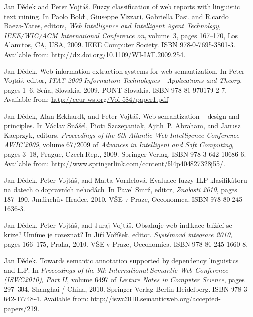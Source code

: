 \begin{description}
\item
Jan D{\v{e}}dek and Peter Vojt{\'{a}}{\v{s}}.
\newblock Fuzzy classification of web reports with linguistic text mining.
\newblock In Paolo Boldi, Giuseppe Vizzari, Gabriella Pasi, and Ricardo
  Baeza-Yates, editors, {\em Web Intelligence and Intelligent Agent Technology,
  IEEE/WIC/ACM International Conference on}, volume~3, pages 167--170, Los
  Alamitos, CA, USA, 2009. IEEE Computer Society.
\newblock ISBN 978-0-7695-3801-3.
\newblock Available from: \url{http://dx.doi.org/10.1109/WI-IAT.2009.254}.

\item
Jan D{\v{e}}dek.
\newblock Web information extraction systems for web semantization.
\newblock In Peter Vojt{\'{a}}{\v{s}}, editor, {\em {ITAT} 2009 Information
  Technologies - Applications and Theory}, pages 1--6, Se{\v{n}}a, Slovakia,
  2009. {PONT} Slovakia.
\newblock ISBN 978-80-970179-2-7.
\newblock Available from: \url{http://ceur-ws.org/Vol-584/paper1.pdf}.

\item
Jan D{\v{e}}dek, Alan Eckhardt, and Peter Vojt{\'{a}}{\v{s}}.
\newblock Web semantization -- design and principles.
\newblock In V{\'{a}}clav Sn{\'{a}}{\v{s}}el, Piotr Szczepaniak, Ajith~P.
  Abraham, and Janusz Kacprzyk, editors, {\em Proceedings of the 6th Atlantic
  Web Intelligence Conference - {AWIC}'2009}, volume 67/2009 of {\em Advances
  in Intelligent and Soft Computing}, pages 3--18, Prague, Czech Rep., 2009.
  Springer Verlag.
\newblock ISBN 978-3-642-10686-6.
\newblock Available from:
  \url{http://www.springerlink.com/content/5l4p404827328j55/}.

\item
Jan D{\v{e}}dek, Peter Vojt{\'{a}}{\v{s}}, and Marta Vomlelov{\'{a}}.
\newblock Evaluace fuzzy {ILP} klasifik{\'{a}}toru na datech o dopravn{\'{i}}ch
  nehod{\'{a}}ch.
\newblock In Pavel Smr{\v{z}}, editor, {\em Znalosti 2010}, pages 187--190,
  Jind{\v{r}}ich{\r{u}}v Hradec, 2010. V{\v{S}}E v Praze, Oeconomica.
\newblock ISBN 978-80-245-1636-3.

\item
Jan D{\v{e}}dek, Peter Vojt{\'{a}}{\v{s}}, and Juraj Vojt{\'{a}}{\v{s}}.
\newblock Obsahuje web indikace bl\'{i}\v{z}\'{i}c\'{i} se krize? {U}m\'{i}me
  je rozeznat?
\newblock In Ji\v{r}\'{i} Vo\v{r}\'{i}\v{s}ek, editor, {\em Syst\'{e}mov\'{a}
  integrace 2010}, pages 166--175, Praha, 2010. V{\v{S}}E v Praze, Oeconomica.
\newblock ISBN 978-80-245-1660-8.

\item
Jan D{\v{e}}dek.
\newblock Towards semantic annotation supported by dependency linguistics and
  {ILP}.
\newblock In {\em Proceedings of the 9th International Semantic Web Conference
  (ISWC2010), Part II}, volume 6497 of {\em Lecture Notes in Computer Science},
  pages 297--304, Shanghai / China, 2010. Springer-Verlag Berlin Heidelberg.
\newblock ISBN 978-3-642-17748-4.
\newblock Available from:
  \url{http://iswc2010.semanticweb.org/accepted-papers/219}.


\end{description}
